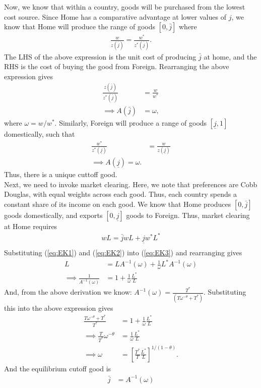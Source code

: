 \documentclass[12pt]{article}
\begin{document}
Now, we know that within a country, goods will be purchased from the lowest cost source. Since Home has a comparative advantage at lower values of $j$, we know that Home will produce the range of goods $[0,\bar j]$ where
\begin{align*}
\frac{w}{z(\bar j)} = \frac{w^*}{z^*(\bar j)}.
\end{align*}
The LHS of the above expression is the unit cost of producing $\bar j$ at home, and the RHS is the cost of buying the good from Foreign. Rearranging the above expression gives
\begin{align}
\frac{z(\bar j)}{z^*(\bar j)} &= \frac{w}{w^*} \nonumber\\
\implies A(\bar j) &= \omega, \label{eq:EK1}
\end{align}
where $\omega = w/w^*$. Similarly, Foreign will produce a range of goods $[\underline j, 1]$ domestically, such that
\begin{align}
\frac{w^*}{z^*(\underline j)} &= \frac{w}{z(\underline j)} \nonumber \\
\implies A(\underline j) = \omega. \label{eq:EK2}
\end{align}
Thus, there is a unique cuttoff good.\\

Next, we need to invoke market clearing. Here, we note that preferences are Cobb Douglas, with equal weights across each good. Thus, each country spends a constant share of its income on each good. We know that Home produces $[0,\bar j]$ goods domestically, and exports $[0, \underline j]$ goods to Foreign. Thus, market clearing at Home requires
\begin{align}
wL = \bar j wL + \underline j w^*L^* \label{eq:EK3}\\
\end{align}
Substituting (\ref{eq:EK1}) and (\ref{eq:EK2}) into (\ref{eq:EK3}) and rearranging gives
\begin{align*}
L &= L A^{-1}(\omega) + \frac{1}{\omega} L^* A^{-1}(\omega)\\
\implies \frac{1}{A^{-1}(\omega)} &= 1 + \frac{1}{\omega} \frac{L^*}{L} 
\end{align*}
And, from the above derivation we know: $A^{-1}(\omega) = \frac{T^*}{(T\omega^{-\theta}+T^*)}$. Substituting this into the above expression gives
\begin{align*}
\frac{T\omega^{-\theta}+T^*}{T^*} &= 1 +\frac{1}{\omega} \frac{L^*}{L}\\
\implies \frac{T}{T^*} \omega^{-\theta} &=\frac{1}{\omega} \frac{L^*}{L}\\
\implies \omega &= \left[\frac{T^*}{T}\frac{L^*}{L}\right]^{1/(1-\theta)}.
\end{align*}
And the equilibrium cutoff good is
\begin{align*}
\bar j &= A^{-1}(\omega)
\end{align*}
\end{document}
